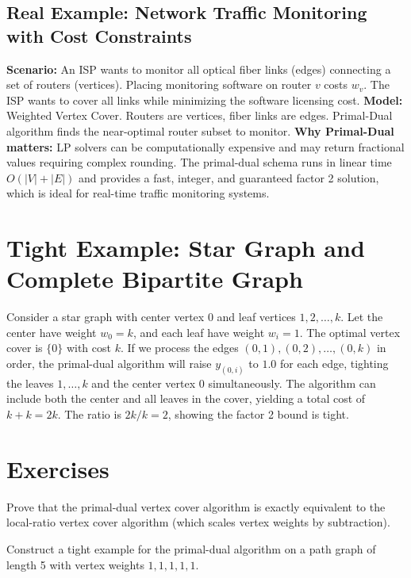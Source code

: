 \subsection*{Real Example: Network Traffic Monitoring with Cost Constraints}
\textbf{Scenario:} An ISP wants to monitor all optical fiber links (edges) connecting a set of routers (vertices). Placing monitoring software on router $v$ costs $w_v$. The ISP wants to cover all links while minimizing the software licensing cost.
\textbf{Model:} Weighted Vertex Cover. Routers are vertices, fiber links are edges. Primal-Dual algorithm finds the near-optimal router subset to monitor.
\textbf{Why Primal-Dual matters:} LP solvers can be computationally expensive and may return fractional values requiring complex rounding. The primal-dual schema runs in linear time $O(|V| + |E|)$ and provides a fast, integer, and guaranteed factor 2 solution, which is ideal for real-time traffic monitoring systems.

\section{Tight Example: Star Graph and Complete Bipartite Graph}
Consider a star graph with center vertex $0$ and leaf vertices $1, 2, \dots, k$. Let the center have weight $w_0 = k$, and each leaf have weight $w_i = 1$. The optimal vertex cover is $\{0\}$ with cost $k$.
If we process the edges $(0, 1), (0, 2), \dots, (0, k)$ in order, the primal-dual algorithm will raise $y_{(0,i)}$ to $1.0$ for each edge, tighting the leaves $1, \dots, k$ and the center vertex $0$ simultaneously. The algorithm can include both the center and all leaves in the cover, yielding a total cost of $k + k = 2k$. The ratio is $2k / k = 2$, showing the factor 2 bound is tight.

\section{Exercises}
\begin{exercise}
Prove that the primal-dual vertex cover algorithm is exactly equivalent to the local-ratio vertex cover algorithm (which scales vertex weights by subtraction).
\end{exercise}
\begin{exercise}
Construct a tight example for the primal-dual algorithm on a path graph of length 5 with vertex weights $1, 1, 1, 1, 1$.
\end{exercise}

